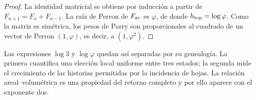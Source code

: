 \begin{proof}
La identidad matricial se obtiene por inducción a partir de
\(F_{n+1}=F_n+F_{n-1}\). La raíz de Perron de \(F_{\rm av}\) es \(\varphi\),
de donde \(h_{\rm top}=\log\varphi\). Como la matriz es simétrica, los pesos
de Parry \cite{Parry1964} son proporcionales al cuadrado de un vector de Perron
\((1,\varphi)\), es decir, a \((1,\varphi^2)\).
\end{proof}

Las expresiones \(\log3\) y \(\log\varphi\) quedan así separadas por su
genealogía. La primera cuantifica una elección local uniforme entre tres
estados; la segunda mide el crecimiento de las historias permitidas por la
incidencia de hojas. La relación areal--volumétrica es una propiedad del
retorno completo y por ello aparece con el exponente dos.

